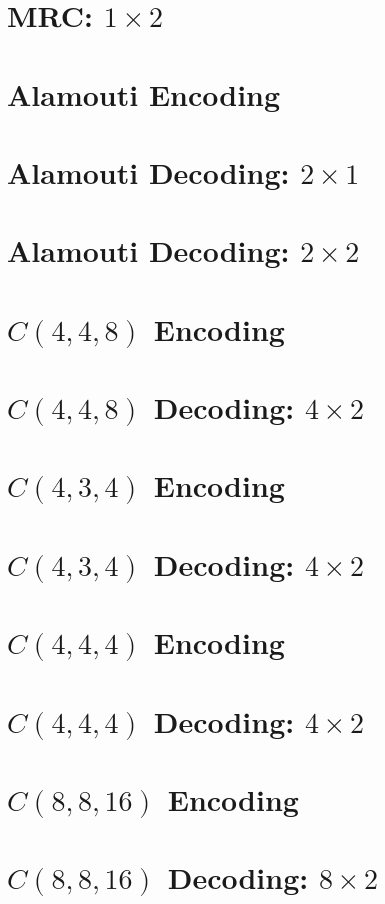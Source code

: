 \documentclass[12pt,onecolumn]{IEEEtran}
\begin{document}
\section{MRC: $1\times2$}

\section{Alamouti Encoding}

\section{Alamouti Decoding: $2\times1$}

\section{Alamouti Decoding: $2\times2$}

\section{$C(4,4,8)$ Encoding}

\section{$C(4,4,8)$ Decoding: $4\times2$}

\section{$C(4,3,4)$ Encoding}

\section{$C(4,3,4)$ Decoding: $4\times2$}

\section{$C(4,4,4)$ Encoding}

\section{$C(4,4,4)$ Decoding: $4\times2$}

\section{$C(8,8,16)$ Encoding}

\section{$C(8,8,16)$ Decoding: $8\times2$}

\end{document}
